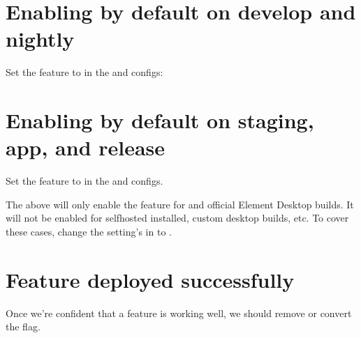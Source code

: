 \documentclass[letterpaper,10pt,openany,oneside,english]{sphinxmanual}
\begin{document}
\chapter{Enabling by default on develop and nightly}
\label{\detokenize{feature-flags:enabling-by-default-on-develop-and-nightly}}
\sphinxAtStartPar
Set the feature to  in the
and
configs:

\begin{sphinxVerbatim}[commandchars=\\\{\}]
 
     
\end{sphinxVerbatim}


\chapter{Enabling by default on staging, app, and release}
\label{\detokenize{feature-flags:enabling-by-default-on-staging-app-and-release}}
\sphinxAtStartPar
Set the feature to  in the
and
configs.

\sphinxAtStartPar
{} The above will only enable the feature for  and official Element
Desktop builds. It will not be enabled for self\sphinxhyphen{}hosted installed, custom desktop builds, etc. To
cover these cases, change the setting’s  in  to .


\chapter{Feature deployed successfully}
\label{\detokenize{feature-flags:feature-deployed-successfully}}
\sphinxAtStartPar
Once we’re confident that a feature is working well, we should remove or convert the flag.
\end{document}
